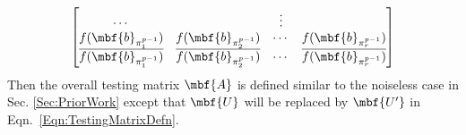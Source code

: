 \documentclass[conference,twocolumn]{IEEEtran}
\begin{document}
{\begin{align}
\begin{bmatrix}
\cdots &  &\vdots \\
f(\mbf{b}_{\pi^{p-1}_{1}}) & f(\mbf{b}_{\pi^{p-1}_{2}}) & \cdots & f(\mbf{b}_{\pi^{p-1}_{r}})\\
\overline{f(\mbf{b}_{\pi^{p-1}_{1}})} & \overline{f(\mbf{b}_{\pi^{p-1}_{2}})} & \cdots & \overline{f(\mbf{b}_{\pi^{p-1}_{r}})}\\
\end{bmatrix}
\end{align}
Then the overall testing matrix $\mbf{A}$ is defined similar to the noiseless case in Sec. \ref{Sec:PriorWork} except that $\mbf{U}$ will be replaced by $\mbf{U'}$ in Eqn.~\eqref{Eqn:TestingMatrixDefn}.  %

}
\end{document}

